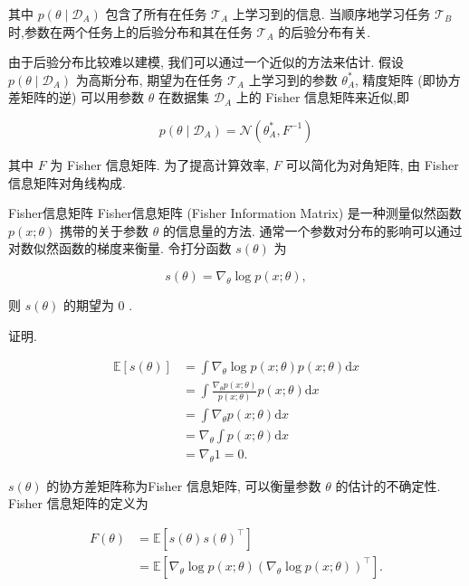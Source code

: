 \documentclass[10pt]{article}
\begin{document}
其中 $p\left(\theta \mid \mathcal{D}_{A}\right)$ 包含了所有在任务 $\mathcal{T}_{A}$ 上学习到的信息. 当顺序地学习任务 $\mathcal{T}_{B}$ 时,参数在两个任务上的后验分布和其在任务 $\mathcal{T}_{A}$ 的后验分布有关.

由于后验分布比较难以建模, 我们可以通过一个近似的方法来估计. 假设 $p\left(\theta \mid \mathcal{D}_{A}\right)$ 为高斯分布, 期望为在任务 $\mathcal{T}_{A}$ 上学习到的参数 $\theta_{A}^{*}$, 精度矩阵 (即协方差矩阵的逆) 可以用参数 $\theta$ 在数据集 $\mathcal{D}_{A}$ 上的 Fisher 信息矩阵来近似,即


\begin{equation*}
p\left(\theta \mid \mathcal{D}_{A}\right)=\mathcal{N}\left(\theta_{A}^{*}, F^{-1}\right) \tag{10.39}
\end{equation*}


其中 $F$ 为 Fisher 信息矩阵. 为了提高计算效率, $F$ 可以简化为对角矩阵, 由 Fisher 信息矩阵对角线构成.

Fisher信息矩阵 Fisher信息矩阵 (Fisher Information Matrix) 是一种测量似然函数 $p(x ; \theta)$ 携带的关于参数 $\theta$ 的信息量的方法. 通常一个参数对分布的影响可以通过对数似然函数的梯度来衡量. 令打分函数 $s(\theta)$ 为


\begin{equation*}
s(\theta)=\nabla_{\theta} \log p(x ; \theta), \tag{10.40}
\end{equation*}


则 $s(\theta)$ 的期望为 0 .

证明.


\begin{align*}
\mathbb{E}[s(\theta)] & =\int \nabla_{\theta} \log p(x ; \theta) p(x ; \theta) \mathrm{d} x  \tag{10.41}\\
& =\int \frac{\nabla_{\theta} p(x ; \theta)}{p(x ; \theta)} p(x ; \theta) \mathrm{d} x  \tag{10.42}\\
& =\int \nabla_{\theta} p(x ; \theta) \mathrm{d} x  \tag{10.43}\\
& =\nabla_{\theta} \int p(x ; \theta) \mathrm{d} x  \tag{10.44}\\
& =\nabla_{\theta} 1=0 . \tag{10.45}
\end{align*}


$s(\theta)$ 的协方差矩阵称为Fisher 信息矩阵, 可以衡量参数 $\theta$ 的估计的不确定性. Fisher 信息矩阵的定义为


\begin{align*}
F(\theta) & =\mathbb{E}\left[s(\theta) s(\theta)^{\top}\right]  \tag{10.46}\\
& =\mathbb{E}\left[\nabla_{\theta} \log p(x ; \theta)\left(\nabla_{\theta} \log p(x ; \theta)\right)^{\top}\right] . \tag{10.47}
\end{align*}
\end{document}
